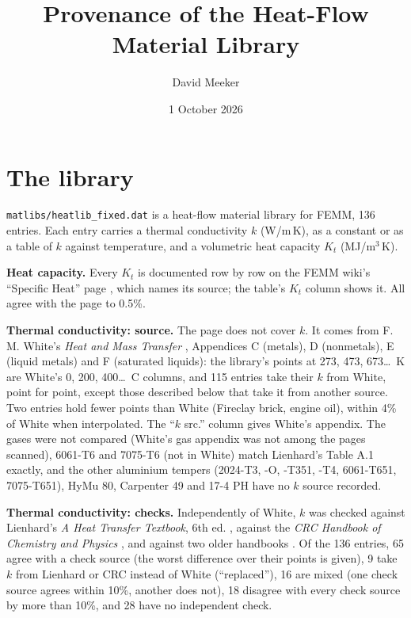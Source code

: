 \documentclass[10pt]{article}
\title{Provenance of the Heat-Flow Material Library}
\author{David Meeker}
\date{1 October 2026}
\begin{document}
\maketitle

\section*{The library}

\texttt{matlibs/heatlib\_fixed.dat} is a heat-flow material library for FEMM, 136 entries. Each entry carries a thermal conductivity $k$ (W/m\,K), as a constant or as a table of $k$ against temperature, and a volumetric heat capacity $K_t$ (MJ/m$^3$\,K).

\textbf{Heat capacity.} Every $K_t$ is documented row by row on the FEMM wiki's ``Specific Heat'' page \cite{specheat}, which names its source; the table's $K_t$ column shows it. All agree with the page to 0.5\%.

\textbf{Thermal conductivity: source.} The page does not cover $k$. It comes from F. M. White's \emph{Heat and Mass Transfer} \cite{white}, Appendices C (metals), D (nonmetals), E (liquid metals) and F (saturated liquids): the library's points at 273, 473, 673\ldots\ K are White's 0, 200, 400\ldots\ \textdegree C columns, and 115 entries take their $k$ from White, point for point, except those described below that take it from another source. Two entries hold fewer points than White (Fireclay brick, engine oil), within 4\% of White when interpolated. The ``$k$ src.'' column gives White's appendix. The gases were not compared (White's gas appendix was not among the pages scanned), 6061-T6 and 7075-T6 (not in White) match Lienhard's Table A.1 exactly, and the other aluminium tempers (2024-T3, -O, -T351, -T4, 6061-T651, 7075-T651), HyMu 80, Carpenter 49 and 17-4 PH have no $k$ source recorded.

\textbf{Thermal conductivity: checks.} Independently of White, $k$ was checked against Lienhard's \emph{A Heat Transfer Textbook}, 6th ed. \cite{lienhard6}, against the \emph{CRC Handbook of Chemistry and Physics} \cite{crc}, and against two older handbooks \cite{rohsenow,kreithhb}. Of the 136 entries, 65 agree with a check source (the worst difference over their points is given), 9 take $k$ from Lienhard or CRC instead of White (``replaced''), 16 are mixed (one check source agrees within 10\%, another does not), 18 disagree with every check source by more than 10\%, and 28 have no independent check.
\end{document}
